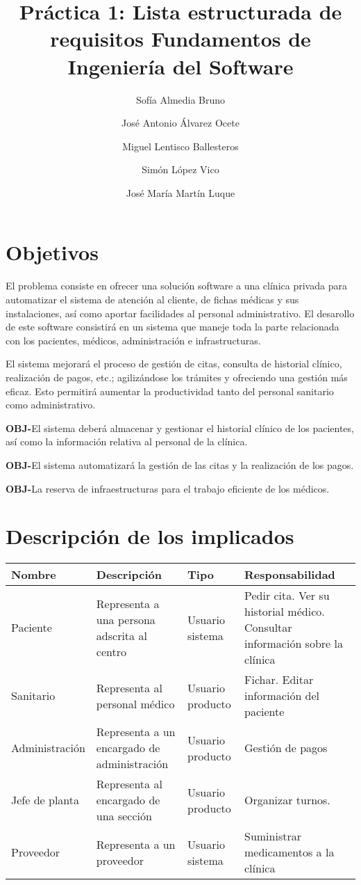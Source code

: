 \documentclass[12pt,a4paper]{article}
\title{Práctica 1: Lista estructurada de requisitos \large Fundamentos de Ingeniería del Software}
\author{Sofía Almedia Bruno \and José Antonio Álvarez Ocete \and Miguel Lentisco Ballesteros \and Simón López Vico \and José María Martín Luque}
\newcounter{ObjCounter}
\newcommand{\obj}[1]{\addtocounter{ObjCounter}{1}\textbf{\rmfamily OBJ-\theObjCounter}\quad#1\\}
\begin{document}
\maketitle

\section{Objetivos} %
\label{sec:estudio_del_dominio_del_problema}

El problema consiste en ofrecer una solución software a una clínica privada para automatizar el sistema de atención al cliente, de fichas médicas y sus instalaciones, así como aportar facilidades al personal administrativo. El desarollo de este software consistirá en un sistema que maneje toda la parte relacionada con los pacientes, médicos, administración e infrastructuras.

El sistema mejorará el proceso de gestión de citas, consulta de historial clínico, realización de pagos, etc.; agilizándose los trámites y ofreciendo una gestión más eficaz. Esto permitirá aumentar la productividad tanto del personal sanitario como administrativo.

\obj{El sistema deberá almacenar y gestionar el historial clínico de  los pacientes, así como la información relativa al personal de la clínica.}
\obj{El sistema automatizará la gestión de las citas y la realización de los pagos.}
\obj{La reserva de infraestructuras para el trabajo eficiente de los médicos.}

\section{Descripción de los implicados} %
\label{sec:descripción_de_los_implicados}
\begin{adjustbox}{center}
	\begin{tabular}{l>{\raggedright}p{4cm}l>{\raggedright}p{4cm}}
		\bfseries Nombre &\bfseries Descripción &\bfseries Tipo &\bfseries Responsabilidad \tabularnewline\hline
		Paciente & Representa a una persona adscrita al centro & Usuario sistema & Pedir cita. Ver su historial médico. Consultar información sobre la clínica \tabularnewline
		Sanitario & Representa al personal médico & Usuario producto & Fichar. Editar información del paciente\tabularnewline
		Administración & Representa a un encargado de administración & Usuario producto & Gestión de pagos\tabularnewline
		Jefe de planta & Representa al encargado de una sección & Usuario producto & Organizar turnos.\tabularnewline
		Proveedor & Representa a un proveedor & Usuario sistema & Suministrar medicamentos a la clínica
	\end{tabular}
\end{adjustbox}
\end{document}
